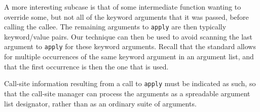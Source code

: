 A more interesting subcase is that of some intermediate function
wanting to override some, but not all of the keyword arguments that it
was passed, before calling the callee.  The remaining arguments to
\texttt{apply} are then typically keyword/value pairs.  Our technique
can then be used to avoid scanning the last argument to \texttt{apply}
for these keyword arguments.  Recall that the standard allows for
multiple occurrences of the same keyword argument in an argument list,
and that the first occurrence is then the one that is used.

Call-site information resulting from a call to \texttt{apply} must be
indicated as such, so that the call-site manager can process the
arguments as a spreadable argument list designator, rather than as an
ordinary suite of arguments.

